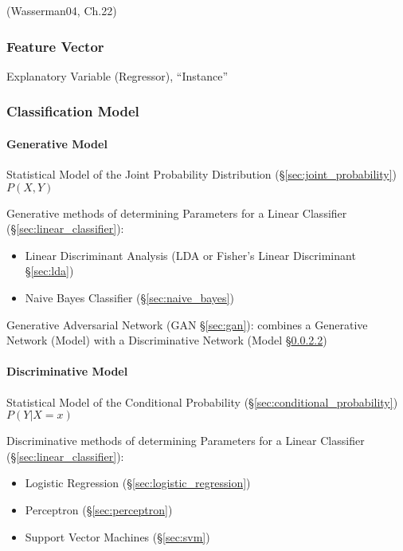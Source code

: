 (Wasserman04, Ch.22)



\subsubsection{Feature Vector}\label{sec:feature_vector}

Explanatory Variable (Regressor), ``Instance''



\subsubsection{Classification Model}\label{sec:classification_model}

\paragraph{Generative Model}\label{sec:generative_model}\hfill

Statistical Model of the Joint Probability Distribution
(\S\ref{sec:joint_probability}) $P(X,Y)$

Generative methods of determining Parameters for a Linear Classifier
(\S\ref{sec:linear_classifier}):
\begin{itemize}
  \item Linear Discriminant Analysis (LDA or Fisher's Linear Discriminant
    \S\ref{sec:lda})
  \item Naive Bayes Classifier (\S\ref{sec:naive_bayes})
\end{itemize}

\fist Generative Adversarial Network (GAN \S\ref{sec:gan}): combines a
Generative Network (Model) with a Discriminative Network (Model
\S\ref{sec:discriminative_model})



\paragraph{Discriminative Model}\label{sec:discriminative_model}\hfill

Statistical Model of the Conditional Probability
(\S\ref{sec:conditional_probability}) $P(Y | X = x)$

Discriminative methods of determining Parameters for a Linear Classifier
(\S\ref{sec:linear_classifier}):
\begin{itemize}
  \item Logistic Regression (\S\ref{sec:logistic_regression})
  \item Perceptron (\S\ref{sec:perceptron})
  \item Support Vector Machines (\S\ref{sec:svm})
\end{itemize}



